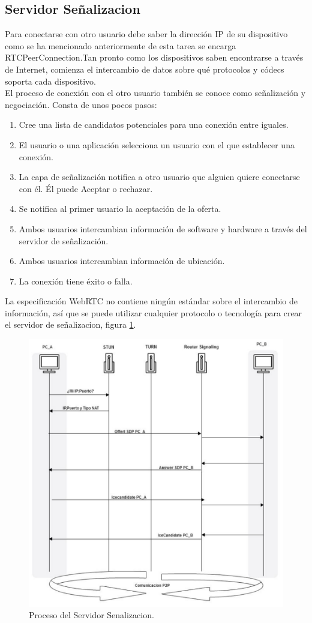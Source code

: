 \subsection{Servidor Señalizacion}
Para conectarse con otro usuario debe saber la dirección IP de su dispositivo como se ha mencionado anteriormente de esta tarea se encarga RTCPeerConnection.Tan pronto como los dispositivos saben encontrarse a través de Internet, comienza el intercambio de datos sobre qué protocolos y códecs soporta cada dispositivo.
\\El proceso de conexión con el otro usuario también se conoce como señalización y negociación. Consta de unos pocos pasos:
\begin{enumerate}
\item Cree una lista de candidatos potenciales para una conexión entre iguales.
\item El usuario o una aplicación selecciona un usuario con el que establecer una conexión.
\item La capa de señalización notifica a otro usuario que alguien quiere conectarse con él. Él puede Aceptar o rechazar.
\item Se notifica al primer usuario la aceptación de la oferta.
\item Ambos usuarios intercambian información de software y hardware a través del servidor de señalización.
\item Ambos usuarios intercambian información de ubicación.
\item La conexión tiene éxito o falla.
\end{enumerate}
La especificación WebRTC no contiene ningún estándar sobre el intercambio de información, así que se puede  utilizar cualquier protocolo o tecnología para crear el servidor de señalizacion, figura \ref{fig:procesoSenalizacion}.
\begin{figure}[!h]
\begin{center}
   \includegraphics[width=0.5\linewidth]{Figures/procesoSenalizacion}
	\decoRule
	\caption[Proceso del Servidor Senalizacion]{Proceso del Servidor Senalizacion.}
\label{fig:procesoSenalizacion}
\end{center}
\end{figure}

